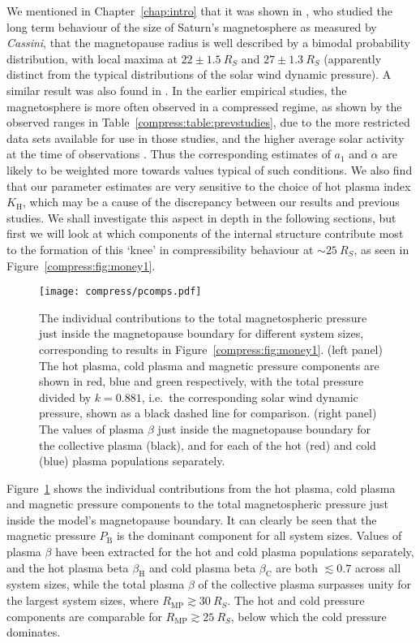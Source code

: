 We mentioned in Chapter~\ref{chap:intro} that it was shown in \citet{achilleos2008}, who studied the long term behaviour of the size of Saturn's magnetosphere as measured by \textit{Cassini}, that the magnetopause radius is well described by a bimodal probability distribution, with local maxima at $22 \pm \SI{1.5}{R_S}$ and $27 \pm \SI{1.3}{R_S}$ (apparently distinct from the typical distributions of the solar wind dynamic pressure). A similar result was also found in \citet{pilkington2015}. In the earlier empirical studies, the magnetosphere is more often observed in a compressed regime, as shown by the observed ranges in Table~\ref{compress:table:prevstudies}, due to the more restricted data sets available for use in those studies, and the higher average solar activity at the time of observations \cite[e.g.][]{hathaway2015}. Thus the corresponding estimates of $a_1$ and $\alpha$ are likely to be weighted more towards values typical of such conditions. We also find that our parameter estimates are very sensitive to the choice of hot plasma index $K_\mathrm{H}$, which may be a cause of the discrepancy between our results and previous studies. We shall investigate this aspect in depth in the following sections, but first we will look at which components of the internal structure contribute most to the formation of this `knee' in compressibility behaviour at ${\sim}\SI{25}{R_S}$, as seen in Figure~\ref{compress:fig:money1}.

\begin{figure}
\centering
\noindent\texttt{[image: compress/pcomps.pdf]}
\caption[Pressure components and plasma $\beta$ just inside the magnetopause boundary for typical $K_\mathrm{H}$.]{The individual contributions to the total magnetospheric pressure just inside the magnetopause boundary for different system sizes, corresponding to results in Figure~\ref{compress:fig:money1}. (left panel) The hot plasma, cold plasma and magnetic pressure components are shown in red, blue and green respectively, with the total pressure divided by $k=0.881$, i.e.\ the corresponding solar wind dynamic pressure, shown as a black dashed line for comparison. (right panel) The values of plasma $\beta$ just inside the magnetopause boundary for the collective plasma (black), and for each of the hot (red) and cold (blue) plasma populations separately.}
\label{compress:fig:pcomps}
\end{figure}

Figure~\ref{compress:fig:pcomps} shows the individual contributions from the hot plasma, cold plasma and magnetic pressure components to the total magnetospheric pressure just inside the model's magnetopause boundary. It can clearly be seen that the magnetic pressure $P_\mathrm{B}$ is the dominant component for all system sizes. Values of plasma $\beta$ have been extracted for the hot and cold plasma populations separately, and the hot plasma beta $\beta_\mathrm{H}$ and cold plasma beta $\beta_\mathrm{C}$ are both $\lesssim 0.7$ across all system sizes, while the total plasma $\beta$ of the collective plasma surpasses unity for the largest system sizes, where $R_\mathrm{MP} \gtrsim \SI{30}{R_S}$. The hot and cold pressure components are comparable for $R_\mathrm{MP} \gtrsim \SI{25}{R_S}$, below which the cold pressure dominates. 
 
